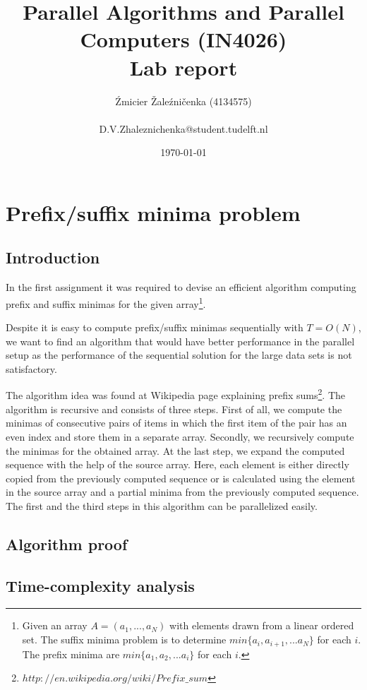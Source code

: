 \documentclass[a4paper,10pt,notitlepage]{article}
\title{Parallel Algorithms and Parallel Computers (IN4026) \\ Lab report}
\author{Źmicier Žaleźničenka (4134575) \\ \\
D.V.Zhaleznichenka@student.tudelft.nl}
\date{\today}
\begin{document}
\maketitle

\section{Prefix/suffix minima problem}

\subsection{Introduction}

In the first assignment it was required to devise an efficient algorithm computing prefix and suffix minimas for the given array\footnote{Given an array \(A = (a_1, . . . , a_N)\) with elements drawn from a linear ordered set. The suffix minima problem is to determine \(min\{a_i, a_{i+1}, . . . a_N\}\) for each $i$. The prefix minima are \(min\{a_1, a_2, . . . a_i\}\) for each $i$.}. 

Despite it is easy to compute prefix/suffix minimas sequentially with \(T = O(N)\), we want to find an algorithm that would have better performance in the parallel setup as the performance of the sequential solution for the large data sets is not satisfactory.

The algorithm idea was found at Wikipedia page explaining prefix sums\footnote{$http://en.wikipedia.org/wiki/Prefix\_sum$}. The algorithm is recursive and consists of three steps. First of all, we compute the minimas of consecutive pairs of items in which the first item of the pair has an even index and store them in a separate array. Secondly, we recursively compute the minimas for the obtained array. At the last step, we expand the computed sequence with the help of the source array. Here, each element is either directly copied from the previously computed sequence or is calculated using the element in the source array and a partial minima from the previously computed sequence. The first and the third steps in this algorithm can be parallelized easily.

\subsection{Algorithm proof}

\subsection{Time-complexity analysis}
\end{document}
